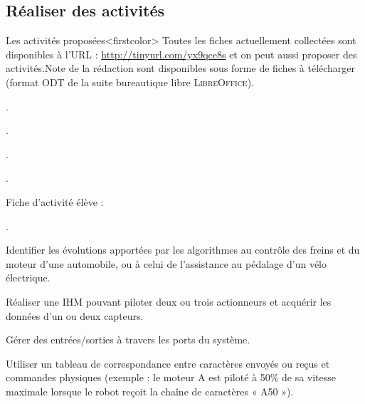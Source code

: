 \subsection[Réaliser des activités]{Réaliser des activités}
\label{sub:VIII.3.2}


Les activités proposées\caution[t]<firstcolor>{%
Toutes les fiches actuellement collectées sont disponibles à l'URL : \url{http://tinyurl.com/yx9qce8s} et on peut aussi proposer des activités.}{Note de la rédaction}
sont disponibles sous forme de fiches à télécharger (format ODT de la suite bureautique libre \textsc{LibreOffice}).

\begin{jazzitemize}
\item {}.
\item {}.
\item {}.
\item {}.
\end{jazzitemize}

\noindent Fiche d'activité élève :
\begin{jazzitemize}
\item {}.
\end{jazzitemize}


\begin{tcolorbox}[title={Ce que propose le programme}, toprule=0pt, leftrule=0pt, rightrule=0pt, arc=0pt,
                  fonttitle=\scshape\boxtitlefont,
                  colbacktitle=white, coltitle=firstcolor, colframe=firstcolor, colback=firstcolor!10,
                  breakable, enhanced jigsaw]
\begin{jazzitemize}
\item Identifier les évolutions apportées par les algorithmes au contrôle des freins et du moteur d’une automobile, ou à celui de l’assistance au pédalage d’un vélo électrique.   
\item Réaliser une IHM pouvant piloter deux ou trois actionneurs et acquérir les données d’un ou deux capteurs. 
\item Gérer des entrées/sorties à travers les ports du système. 
\item Utiliser un tableau de correspondance entre caractères envoyés ou reçus et commandes physiques (exemple : le moteur A est piloté à 50\% de sa vitesse maximale lorsque le robot reçoit la chaîne de caractères « A50 »).
\end{jazzitemize}
\end{tcolorbox}


